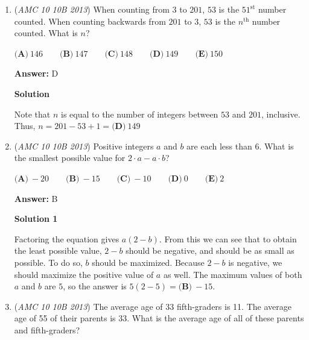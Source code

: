 \begin{enumerate}
 $\textbf{(A)}\ -13\qquad\textbf{(B)}\ -8\qquad\textbf{(C)}\ -5\qquad\textbf{(D)}\ -3\qquad\textbf{(E)}\ 11$

 \textbf{Answer: }C



\textbf{Solution}

Let $L$ be the low temperature. The high temperature is $L+16$. The average is $\frac{L+(L+16)}{2}=3$. Solving for $L$, we get $L=\boxed{\textbf{(C)} \  -5}$



	\item (\textit{AMC 10 10B 2013}) When counting from $3$ to $201$, $53$ is the $51^\mathrm{st}$ number counted. When counting backwards from $201$ to $3$, $53$ is the $n^\mathrm{th}$ number counted. What is $n$?


 $\textbf{(A)}\ 146\qquad\textbf{(B)}\ 147\qquad\textbf{(C)}\ 148\qquad\textbf{(D)}\ 149\qquad\textbf{(E)}\ 150$

 \textbf{Answer: }D



\textbf{Solution}

Note that $n$ is equal to the number of integers between $53$ and $201$, inclusive. Thus, $n=201-53+1=\boxed{\textbf{(D)}\ 149}$



	\item (\textit{AMC 10 10B 2013}) Positive integers $a$ and $b$ are each less than $6$. What is the smallest possible value for $2 \cdot a - a \cdot b$?


 

$\textbf{(A)}\ -20\qquad\textbf{{(B)}}\ -15\qquad\textbf{{(C)}}\ -10\qquad\textbf{{(D)}}\ 0\qquad\textbf{{(E)}}\ 2$

 \textbf{Answer: }B



\textbf{Solution 1}

Factoring the equation gives $a(2 - b)$. From this we can see that to obtain the least possible value, $2 - b$ should be negative, and should be as small as possible. To do so, $b$ should be maximized. Because $2 - b$ is negative, we should maximize the positive value of $a$ as well. The maximum values of both $a$ and $b$ are $5$, so the answer is $5(2 - 5) = \boxed{\textbf{(B)}\ -15}$.

 


	\item (\textit{AMC 10 10B 2013}) The average age of 33 fifth-graders is 11. The average age of 55 of their parents is 33. What is the average age of all of these parents and fifth-graders?



\end{enumerate}
